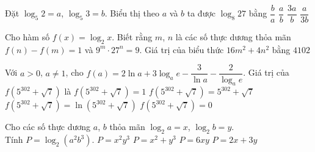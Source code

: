 \begin{ex}%
	Đặt $\log _5 2=a$, $\log _5 3=b$. Biểu thị theo $a$ và $b$ ta  được $\log _8 27$ bằng
	 \choice
		{\True $\dfrac{b}{a}$} 
		 {$\dfrac{a}{b}$}
		{$\dfrac{3 a}{b}$} 
		 {$\dfrac{a}{3b}$}
\end{ex}

\begin{ex}%
	Cho hàm số $f(x)=\log_2 x$. Biết rằng $m$, $n$ là các số thực dương thỏa mãn $f(n)-f(m)=1$  và $9^m \cdot 27^n=9$. Giá trị của biểu thức $16 m^2+4 n^2$ bằng
	\choice 
		{$4$}{$1$}{$0$}{\True  $2$}
\end{ex}

\begin{ex}%
	Với $a>0$, $a \neq 1$, cho $f(a)=2\ln a+3 \log_a  e-\dfrac{3}{\ln a}-\dfrac{2}{\log_a e}$. Giá trị của $f\left(5^{302}+\sqrt{7}\right)$ là
	\choice 
		 {$f\left(5^{302}+\sqrt{7}\right)=1$}
		{$f\left(5^{302}+\sqrt{7}\right)=5^{302}+\sqrt{7}$} 
		 {$f\left(5^{302}+\sqrt{7}\right)=\ln \left(5^{302}+\sqrt{7}\right)$}
		{\True  $f\left(5^{302}+\sqrt{7}\right)=0$}
\end{ex}

\begin{ex}%
	Cho các số thực dương $ a$, $ b$ thỏa mãn $\log_2a=x$, $\log_2b=y$.\\ Tính $ P=\log_2\left(a^2b^3\right)$. 
	 \choice
		 {$ P=x^2y^3$}
		{$  P=x^2+y^3$}
		{$ P=6xy$} 
		{\True  $ P=2x+3y$}
\end{ex}


